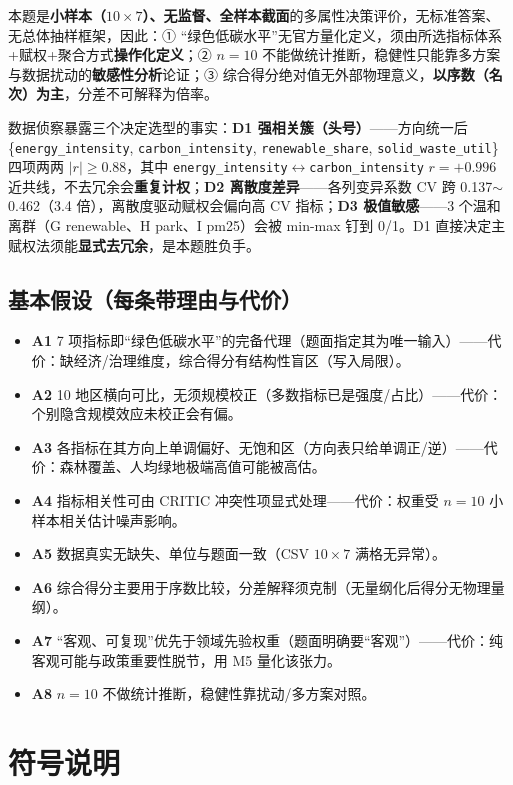 \documentclass[12pt,a4paper]{ctexart}
\begin{document}
本题是\textbf{小样本（$10\times7$）、无监督、全样本截面}的多属性决策评价，无标准答案、无总体抽样框架，因此：① ``绿色低碳水平''无官方量化定义，须由所选指标体系+赋权+聚合方式\textbf{操作化定义}；② $n=10$ 不能做统计推断，稳健性只能靠多方案与数据扰动的\textbf{敏感性分析}论证；③ 综合得分绝对值无外部物理意义，\textbf{以序数（名次）为主}，分差不可解释为倍率。

数据侦察暴露三个决定选型的事实：\textbf{D1 强相关簇（头号）}——方向统一后 \{\texttt{energy\_intensity}, \texttt{carbon\_intensity}, \texttt{renewable\_share}, \texttt{solid\_waste\_util}\} 四项两两 $|r|\geq0.88$，其中 \texttt{energy\_intensity}$\leftrightarrow$\texttt{carbon\_intensity} $r=+0.996$ 近共线，不去冗余会\textbf{重复计权}；\textbf{D2 离散度差异}——各列变异系数 CV 跨 0.137$\sim$0.462（3.4 倍），离散度驱动赋权会偏向高 CV 指标；\textbf{D3 极值敏感}——3 个温和离群（G renewable、H park、I pm25）会被 min-max 钉到 0/1。D1 直接决定主赋权法须能\textbf{显式去冗余}，是本题胜负手。

\subsection{基本假设（每条带理由与代价）}

\begin{itemize}
\item \textbf{A1} 7 项指标即``绿色低碳水平''的完备代理（题面指定其为唯一输入）——代价：缺经济/治理维度，综合得分有结构性盲区（写入局限）。
\item \textbf{A2} 10 地区横向可比，无须规模校正（多数指标已是强度/占比）——代价：个别隐含规模效应未校正会有偏。
\item \textbf{A3} 各指标在其方向上单调偏好、无饱和区（方向表只给单调正/逆）——代价：森林覆盖、人均绿地极端高值可能被高估。
\item \textbf{A4} 指标相关性可由 CRITIC 冲突性项显式处理——代价：权重受 $n=10$ 小样本相关估计噪声影响。
\item \textbf{A5} 数据真实无缺失、单位与题面一致（CSV $10\times7$ 满格无异常）。
\item \textbf{A6} 综合得分主要用于序数比较，分差解释须克制（无量纲化后得分无物理量纲）。
\item \textbf{A7} ``客观、可复现''优先于领域先验权重（题面明确要``客观''）——代价：纯客观可能与政策重要性脱节，用 M5 量化该张力。
\item \textbf{A8} $n=10$ 不做统计推断，稳健性靠扰动/多方案对照。
\end{itemize}

\section{符号说明}
\end{document}
